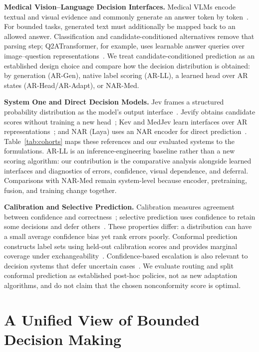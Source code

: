 \textbf{Medical Vision--Language Decision Interfaces.}
Medical VLMs encode textual and visual evidence and commonly generate an answer token by token~\citep{sellergren2025medgemma,sellergren2026medgemma15}. For bounded tasks, generated text must additionally be mapped back to an allowed answer. Classification and candidate-conditioned alternatives remove that parsing step; Q2ATransformer, for example, uses learnable answer queries over image--question representations~\citep{liu2023q2atransformer}. We treat candidate-conditioned prediction as an established design choice and compare how the decision distribution is obtained: by generation (AR-Gen), native label scoring (AR-LL), a learned head over AR states (AR-Head/AR-Adapt), or NAR-Med.

\textbf{System One and Direct Decision Models.}
Jev frames a structured probability distribution as the model's output interface~\citep{almeida2026jev}. Jevify obtains candidate scores without training a new head~\citep{castro2026jevify,patil2026jevify}; Kev and MedJev learn interfaces over AR representations~\citep{palmer2026kev,ma2026medjev}; and NAR (Laya) uses an NAR encoder for direct prediction~\citep{nandhakishor2026laya}. Table~\ref{tab:cohorts} maps these references and our evaluated systems to the formulations. AR-LL is an inference-engineering baseline rather than a new scoring algorithm: our contribution is the comparative analysis alongside learned interfaces and diagnostics of errors, confidence, visual dependence, and deferral. Comparisons with NAR-Med remain system-level because encoder, pretraining, fusion, and training change together.

\textbf{Calibration and Selective Prediction.}
Calibration measures agreement between confidence and correctness~\citep{guo2017calibration}; selective prediction uses confidence to retain some decisions and defer others~\citep{geifman2017selective,geifman2019selectivenet}. These properties differ: a distribution can have a small average confidence bias yet rank errors poorly. Conformal prediction constructs label sets using held-out calibration scores and provides marginal coverage under exchangeability~\citep{vovk2005algorithmic}. Confidence-based escalation is also relevant to decision systems that defer uncertain cases~\citep{li2026jevjudge}. We evaluate routing and split conformal prediction as established post-hoc policies, not as new adaptation algorithms, and do not claim that the chosen nonconformity score is optimal.

\section{A Unified View of Bounded Decision Making}
\label{sec:method}

